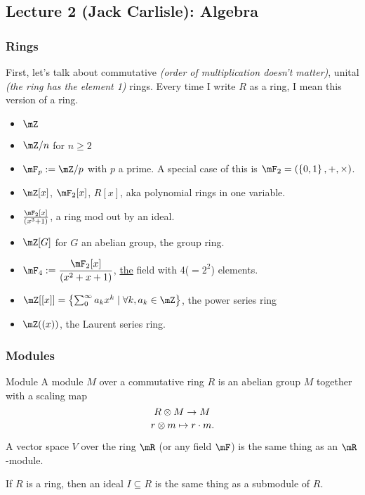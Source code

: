 \newpage

\subsection{Lecture 2 (Jack Carlisle): Algebra}

\subsubsection{Rings}
First, let's talk about commutative \emph{(order of multiplication doesn't matter)}, unital \emph{(the ring has the element 1)} rings. Every time I write $R$ as a ring, I mean this version of a ring. 
\begin{example}{}{}
    \begin{itemize}
        \item $\mZ$
        \item $\mZ/n$ for $n\geq 2$
        \item $\mF_p:=\mZ/p$ with $p$ a prime. A special case of this is $\mF_2 = (\sets{0,1},+,\times)$. 
        \item $\mZ[x]$, $\mF_2[x]$, $R[x]$, aka polynomial rings in one variable. 
        \item $\frac{\mF_2[x]}{(x^3+1)}$, a ring mod out by an ideal. 
        \item $\mZ[G]$ for $G$ an abelian group, the group ring. 
        \item $\ds\mF_4:=\frac{\mF_2[x]}{(x^2+x+1)}$, \ul{the} field with 4($=2^2$) elements. 
        \item $\mZ[[x]] = \sets{\sum_0^\infty a_k x^k\mid \forall k, a_k\in \mZ}$, the power series ring
        \item $\mZ((x))$, the Laurent series ring. 
    \end{itemize}
\end{example}
\subsubsection{Modules}
\begin{definition}{Module}
    A {module} $M$ over a commutative ring $R$ is an abelian group $M$ together with a scaling map $$R\otimes M\to M$$ $$r\otimes m\mapsto r\cdot m.$$
\end{definition}
\begin{example}{}{}
    A vector space $V$ over the ring $\mR$ (or any field $\mF$) is the same thing as an $\mR$-module. 
\end{example}
\begin{example}{}{}
    If $R$ is a ring, then an ideal $I\subseteq R$ is the same thing as a submodule of $R$.
\end{example}

